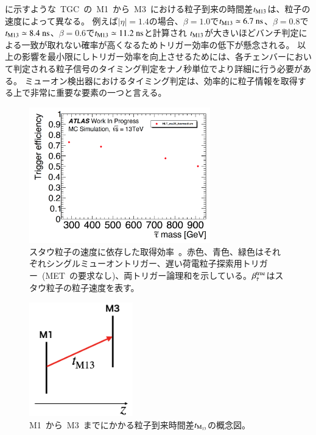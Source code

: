 に示すような~TGC~の~M1~から~M3~における粒子到来の時間差$t_{\rm{M13}}$は、粒子の速度によって異なる。
例えば$|\eta|=1.4$の場合、$\beta=1.0$で$t_{\rm M13}\simeq6.7~\rm ns$、$\beta=0.8$で$t_{\rm M13}\simeq8.4~\rm ns$、$\beta=0.6$で$t_{\rm M13}\simeq11.2~\rm ns$と計算され
$t_{\rm{M13}}$が大きいほどバンチ判定による一致が取れない確率が高くなるためトリガー効率の低下が懸念される。
以上の影響を最小限にしトリガー効率を向上させるためには、各チェンバーにおいて判定される粒子信号のタイミング判定をナノ秒単位でより詳細に行う必要がある。
ミューオン検出器におけるタイミング判定は、効率的に粒子情報を取得する上で非常に重要な要素の一つと言える。
\begin{figure}[tbp]
        \centering   
        \includegraphics[width=0.7\textwidth,page=4]{img/pdf3/sumi.pdf}
        \caption[スタウ粒子の速度に依存した取得効率]{スタウ粒子の速度に依存した取得効率~\cite{MT:01}。赤色、青色、緑色はそれぞれシングルミューオントリガー、遅い荷電粒子探索用トリガー~(MET~の要求なし)、両トリガー論理和を示している。$\beta_{\Tilde{\tau}}^{\rm{true}}$はスタウ粒子の粒子速度を表す。}
        \label{fig:sumi4}
\end{figure}
\begin{figure}[tbp]
        \centering   
        \includegraphics[width=0.4\textwidth,page=4]{img/pdf3/time.png}
        \caption[M1~から~M3~までにかかる粒子到来時間差$t_{\rm M_{13}}$の概念図]
        {M1~から~M3~までにかかる粒子到来時間差$t_{\rm M_{13}}$の概念図。}
        \label{fig:time}
\end{figure}

